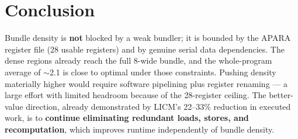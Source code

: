 \documentclass[11pt,a4paper]{article}
\begin{document}
\section{Conclusion}

Bundle density is \textbf{not} blocked by a weak bundler; it is bounded by the APARA
register file (28 usable registers) and by genuine serial data dependencies. The dense
regions already reach the full 8-wide bundle, and the whole-program average of $\sim$2.1 is
close to optimal under those constraints. Pushing density materially higher would require
software pipelining plus register renaming --- a large effort with limited headroom because
of the 28-register ceiling. The better-value direction, already demonstrated by LICM's
22--33\% reduction in executed work, is to \textbf{continue eliminating redundant loads,
stores, and recomputation}, which improves runtime independently of bundle density.
\end{document}
